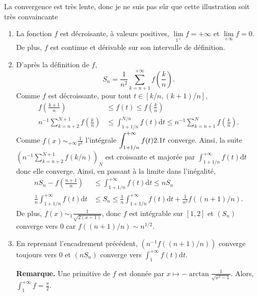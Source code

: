 \begin{marginfigure}
    \centering
    
    \caption{La convergence est très lente, donc je ne suis pas sûr que cette illustration soit très convaincante}
\end{marginfigure}



\begin{elemsolution}
\begin{enumerate}
\item La fonction $f$ est décroisante, à valeurs positives, $\lim\limits_{1^+} f = +\infty$ et $\lim\limits_{+\infty} f = 0$. De plus, $f$ est continue et dérivable sur son intervalle de définition.

\item D'après la définition de $f$,
\[
S_n = \frac{1}{n^2} \sum\limits_{k=n+1}^{+\infty} f\mathopen{}\left(\frac{k}{n}\right).
\]
Comme $f$ est décroissante, pour tout $t \in [k/n,(k+1)/n]$,
\begin{align*}
f\left(\frac{k+1}{n}\right) &\leq f(t) \leq f\left(\frac{k}{n}\right) \\
n^{-1} \sum\limits_{k=n+2}^{N+1} f\left(\frac{k}{n}\right) &\leq \displaystyle\int_{1+1/n}^{N/n} f(t) \mathrm{d}t \leq n^{-1} \sum\limits_{k=n+1}^{N} f\left(\frac{k}{n}\right).
\end{align*}
Comme $f(x) \sim_{+\infty} \frac{1}{x^2}$ l'intégrale $\displaystyle\int_{1+1/n}^{+\infty} f(t) 2.1 t$ converge. Ainsi, la suite $\left(n^{-1}\sum\limits_{k=n+2}^{N+1} f(k/n)\right)_N$ est croissante et majorée par $\displaystyle\int_{1+1/n}^{+\infty} f(t) \mathrm{d}t$ donc elle converge. Ainsi, en passant à la limite dans l'inégalité,
\begin{align*}
n S_n - f\left(\frac{n+1}{n}\right) &\leq \displaystyle\int_{1+1/n}^{+\infty} f(t) \mathrm{d}t \leq n S_n \\
\frac{1}{n} \displaystyle\int_{1+1/n}^{+\infty} f(t) \mathrm{d}t &\leq S_n \leq \frac{1}{n} \displaystyle\int_{1+1/n}^{+\infty} f(t) \mathrm{d}t + \frac{1}{n^2} f((n+1)/n).
\end{align*}
De plus, $f(x) \sim_1 \frac{1}{\sqrt{2 (x - 1)}}$, donc $f$ est intégrable sur $[1, 2]$ et $(S_n)$ converge vers $0$ car $f((n+1)/n) \sim n^{1/2}$.

\item En reprenant l'encadrement précédent, $\left(n^{-1} f((n+1)/n)\right)$ converge toujours vers $0$ et $(n S_n)$ converge vers $\displaystyle\int_1^{+\infty} f(t) \mathrm{d}t$.

\textbf{Remarque.} Une primitive de $f$ est donnée par $x \mapsto - \arctan\frac{1}{\sqrt{x^2 - 1}}$. Alors, $\displaystyle\int_1^{+\infty} f = \frac{\pi}{2}$.
\end{enumerate}
\end{elemsolution}